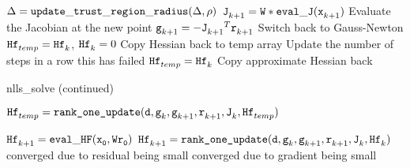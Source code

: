 \begin{algorithm}
\begin{algorithmic}[1]
        \EndIf
        \State $\Delta = {\tt update\_trust\_region\_radius}(\Delta,\rho)$
      \EndWhile
      \State $\iter[k+1]{\tJ} = {\tt W * eval\_J}(\iter[k+1]{\tx})$
      \Comment Evaluate the Jacobian at the new point
      \State $\iter[k+1]{\tg} = -{\iter[k+1]{\tJ}}^T\iter[k+1]{\tr}$
          \If { $\|\iter[k+1]{\tg}\| > \|\iter[k]{\tg} \| $}
          \Comment Switch back to Gauss-Newton
          \State ${\iter[temp]{\thess}} = \iter[k]{\thess}$, $\iter[k]{\thess} = 0$
          \Comment Copy Hessian back to temp array
          \EndIf
        \Else
          \Comment Update the number of steps in a row this has failed
            \State ${\iter[temp]{\thess}} = {\iter[k]{\thess}}$
            \Comment Copy approximate Hessian back
          \EndIf
          \EndIf
        \EndIf
  \end{algorithmic}
  
\end{algorithm}

\begin{algorithm}
\caption{nlls\_solve (continued)}
  \ContinuedFloat
  \begin{algorithmic}
      \State ${\iter[temp]{\thess}} = \Call{{\tt rank\_one\_update}}{\td ,\iter[k]{\tg},\iter[k+1]{\tg}, \iter[k+1]{\tr},\iter[k]{\tJ},\iter[temp]{\thess}}$
      \EndIf
    \EndIf

        \State $\iter[k+1]{\thess} = {\tt eval\_HF(\iter[0]{\tx},W\iter[0]{\tr})}$
      \Else
        \State ${\iter[k+1]{\thess}} = \Call{{\tt rank\_one\_update}}{\td ,\iter[k]{\tg},\iter[k+1]{\tg}, \iter[k+1]{\tr},\iter[k]{\tJ},\iter[k]{\thess}}$
      \EndIf
    \EndIf
    \Comment converged due to residual being small
    \Comment converged due to gradient being small
    \EndIf
    \EndFor

  \end{algorithmic}
\end{algorithm}


